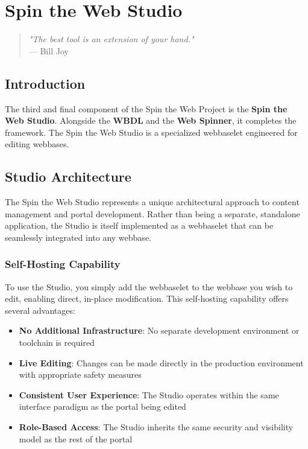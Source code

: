 \chapter{Spin the Web Studio}
\label{chap:studio}

\begin{quote}
\textit{"The best tool is an extension of your hand."} \\
— Bill Joy
\end{quote}

\section{Introduction}

The third and final component of the Spin the Web Project is the \textbf{Spin the Web Studio}. Alongside the \textbf{WBDL} and the \textbf{Web Spinner}, it completes the framework. The Spin the Web Studio is a specialized webbaselet engineered for editing webbases.

\section{Studio Architecture}

The Spin the Web Studio represents a unique architectural approach to content management and portal development. Rather than being a separate, standalone application, the Studio is itself implemented as a webbaselet that can be seamlessly integrated into any webbase.

\subsection{Self-Hosting Capability}

To use the Studio, you simply add the webbaselet to the webbase you wish to edit, enabling direct, in-place modification. This self-hosting capability offers several advantages:

\begin{itemize}
\item \textbf{No Additional Infrastructure}: No separate development environment or toolchain is required
\item \textbf{Live Editing}: Changes can be made directly in the production environment with appropriate safety measures
\item \textbf{Consistent User Experience}: The Studio operates within the same interface paradigm as the portal being edited
\item \textbf{Role-Based Access}: The Studio inherits the same security and visibility model as the rest of the portal
\end{itemize}

